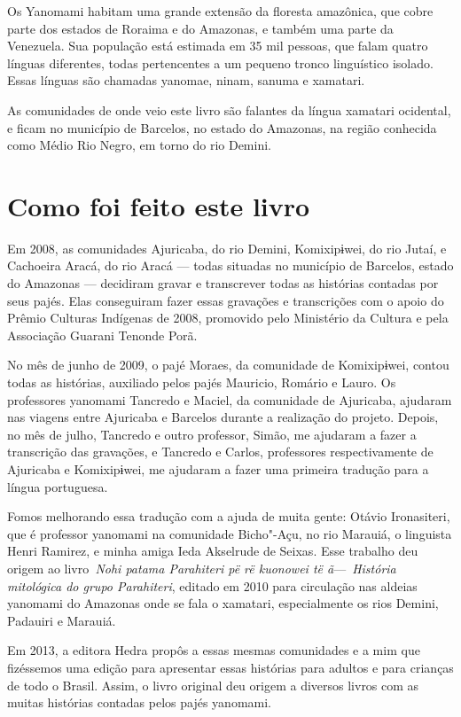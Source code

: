  


Os Yanomami habitam uma grande extensão da floresta amazônica, que cobre
parte dos estados de Roraima e do Amazonas, e também uma parte da
Venezuela. Sua população está estimada em 35 mil pessoas, que falam
quatro línguas diferentes, todas pertencentes a um pequeno tronco
linguístico isolado. Essas línguas são chamadas yanomae, ninam, sanuma e
xamatari.

As comunidades de onde veio este livro são falantes da língua xamatari
ocidental, e ficam no município de Barcelos, no estado do Amazonas, na
região conhecida como Médio Rio Negro, em torno do rio Demini.~

\section{Como foi feito este livro}

Em 2008, as comunidades Ajuricaba, do rio Demini, Komixipɨwei, do rio
Jutaí, e Cachoeira Aracá, do rio Aracá --- todas situadas no município
de Barcelos, estado do Amazonas --- decidiram gravar e transcrever todas
as histórias contadas por seus pajés. Elas conseguiram fazer essas
gravações e transcrições com o apoio do Prêmio Culturas Indígenas de
2008, promovido pelo Ministério da Cultura e pela Associação Guarani
Tenonde Porã.

No mês de junho de 2009, o pajé Moraes, da comunidade de Komixipɨwei,
contou todas as histórias, auxiliado pelos pajés Mauricio, Romário e
Lauro. Os professores yanomami Tancredo e Maciel, da comunidade de
Ajuricaba, ajudaram nas viagens entre Ajuricaba e Barcelos durante a
realização do projeto. Depois, no mês de julho, Tancredo e outro
professor, Simão, me ajudaram a fazer a transcrição das gravações, e
Tancredo e Carlos, professores respectivamente de Ajuricaba e
Komixipɨwei, me ajudaram a fazer uma primeira tradução para a língua
portuguesa.

Fomos melhorando essa tradução com a ajuda de muita gente: Otávio
Ironasiteri, que é professor yanomami na comunidade Bicho"-Açu, no rio
Marauiá, o linguista Henri Ramirez, e minha amiga Ieda Akselrude de
Seixas. Esse trabalho deu origem ao livro\emph{~Nohi patama Parahiteri
pë rë kuonowei të ã}---~\emph{História mitológica do grupo Parahiteri},
editado em 2010 para circulação nas aldeias yanomami do Amazonas onde se
fala o xamatari, especialmente os rios Demini, Padauiri e Marauiá.~

Em 2013, a editora Hedra propôs a essas mesmas comunidades e a mim que
fizéssemos uma edição para apresentar essas histórias para adultos e
para crianças de todo o Brasil. Assim, o livro original deu origem a
diversos livros com as muitas histórias contadas pelos pajés yanomami.
